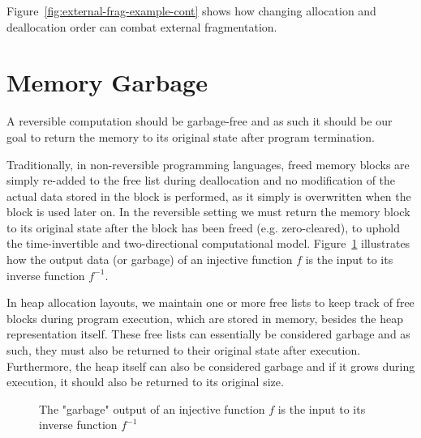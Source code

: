 Figure~\ref{fig:external-frag-example-cont} shows how changing allocation and deallocation order can combat external fragmentation.

\section{Memory Garbage}
\label{sec:memory-garbage}
A reversible computation should be garbage-free and as such it should be our goal to return the memory to its original state after program termination.

Traditionally, in non-reversible programming languages, freed memory blocks are simply re-added to the free list during deallocation and no modification of the actual data stored in the block is performed, as it simply is overwritten when the block is used later on. In the reversible setting we must return the memory block to its original state after the block has been freed (e.g. zero-cleared), to uphold the time-invertible and two-directional computational model. Figure~\ref{fig:injective-garbage-in-out} illustrates how the output data (or garbage) of an injective function $f$ is the input to its inverse function $f^{-1}$.

In heap allocation layouts, we maintain one or more free lists to keep track of free blocks during program execution, which are stored in memory, besides the heap representation itself. These free lists can essentially be considered garbage and as such, they must also be returned to their original state after execution. Furthermore, the heap itself can also be considered garbage and if it grows during execution, it should also be returned to its original size.

\begin{figure}[ht]
  \centering
    \caption{The "garbage" output of an injective function $f$ is the input to its inverse function $f^{-1}$}
    \label{fig:injective-garbage-in-out}
\end{figure}

